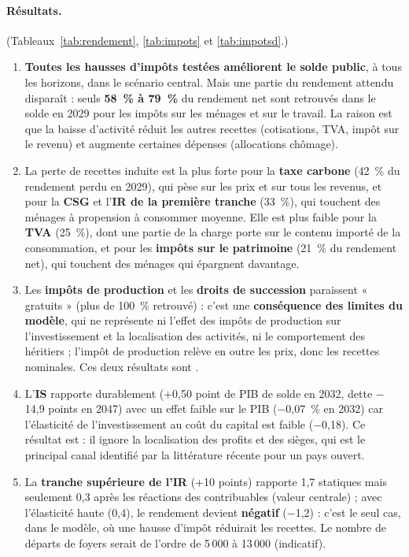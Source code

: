 \begin{table}[htbp]
\centering\scriptsize
\caption{Expérience 1 — Rendement statique et amélioration effective du solde public. « Conservé » : part du rendement
net des réactions comportementales effectivement retrouvée dans le solde en 2029, après les effets sur l'activité.}
\label{tab:rendement}
\end{table}

\paragraph{Résultats.} (Tableaux~\ref{tab:rendement}, \ref{tab:impots} et \ref{tab:impotsd}.)
\begin{enumerate}
\item \textbf{Toutes les hausses d'impôts testées améliorent le solde public}, à tous les horizons, dans le scénario
central. Mais une partie du rendement attendu disparaît : seuls \textbf{58~\% à 79~\%} du rendement net sont retrouvés
dans le solde en 2029 pour les impôts sur les ménages et sur le travail. La raison est que la baisse d'activité réduit
les autres recettes (cotisations, TVA, impôt sur le revenu) et augmente certaines dépenses (allocations chômage).
\item La perte de recettes induite est la plus forte pour la \textbf{taxe carbone} (42~\% du rendement perdu en 2029),
qui pèse sur les prix et sur tous les revenus, et pour la \textbf{CSG} et l'\textbf{IR de la première tranche} (33~\%),
qui touchent des ménages à propension à consommer moyenne. Elle est plus faible pour la \textbf{TVA} (25~\%), dont une
partie de la charge porte sur le contenu importé de la consommation, et pour les \textbf{impôts sur le patrimoine}
(21~\% du rendement net), qui touchent des ménages qui épargnent davantage.
\item Les \textbf{impôts de production} et les \textbf{droits de succession} paraissent « gratuits » (plus de 100~\%
retrouvé) : c'est une \textbf{conséquence des limites du modèle}, qui ne représente ni l'effet des impôts de production
sur l'investissement et la localisation des activités, ni le comportement des héritiers ; l'impôt de production relève
en outre les prix, donc les recettes nominales. Ces deux résultats sont .
\item L'\textbf{IS} rapporte durablement (+0,50 point de PIB de solde en 2032, dette $-$14,9 points en 2047) avec un
effet faible sur le PIB ($-$0,07~\% en 2032) car l'élasticité de l'investissement au coût du capital est faible
($-$0,18). Ce résultat est  : il ignore la localisation des profits et des sièges, qui est le principal
canal identifié par la littérature récente pour un pays ouvert.
\item La \textbf{tranche supérieure de l'IR} (+10 points) rapporte 1,7\md{} statiques mais seulement 0,3\md{} après
les réactions des contribuables (valeur centrale) ; avec l'élasticité haute (0,4), le rendement devient
\textbf{négatif} ($-$1,2\md) : c'est le seul cas, dans le modèle, où une hausse d'impôt réduirait les recettes. Le
nombre de départs de foyers serait de l'ordre de 5\,000 à 13\,000 (indicatif).
\end{enumerate}

